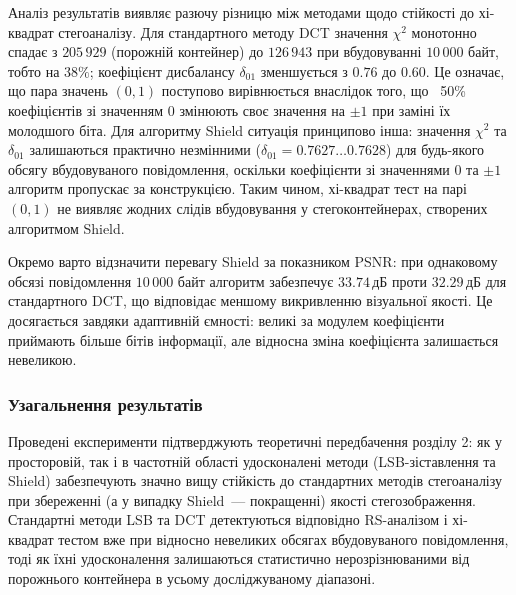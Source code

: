 Аналіз результатів виявляє разючу різницю між методами щодо стійкості до
хі-квадрат стегоаналізу. Для стандартного методу DCT значення $\chi^2$
монотонно спадає з $205\,929$ (порожній контейнер) до $126\,943$ при
вбудовуванні $10\,000$ байт, тобто на $38\%$; коефіцієнт дисбалансу
$\delta_{01}$ зменшується з $0.76$ до $0.60$. Це означає, що пара значень
$(0, 1)$ поступово вирівнюється внаслідок того, що ~50\% коефіцієнтів зі
значенням $0$ змінюють своє значення на $\pm 1$ при заміні їх молодшого
біта. Для алгоритму Shield ситуація принципово інша: значення $\chi^2$ та
$\delta_{01}$ залишаються практично незмінними ($\delta_{01} = 0.7627
\dots 0.7628$) для будь-якого обсягу вбудовуваного повідомлення, оскільки
коефіцієнти зі значеннями $0$ та $\pm 1$ алгоритм пропускає за конструкцією.
Таким чином, хі-квадрат тест на парі $(0, 1)$ не виявляє жодних слідів
вбудовування у стегоконтейнерах, створених алгоритмом Shield.

Окремо варто відзначити перевагу Shield за показником PSNR: при однаковому
обсязі повідомлення $10\,000$ байт алгоритм забезпечує $33.74$\,дБ проти
$32.29$\,дБ для стандартного DCT, що відповідає меншому викривленню
візуальної якості. Це досягається завдяки адаптивній ємності: великі за
модулем коефіцієнти приймають більше бітів інформації, але відносна зміна
коефіцієнта залишається невеликою.

\subsubsection*{Узагальнення результатів}

Проведені експерименти підтверджують теоретичні передбачення розділу 2: як
у просторовій, так і в частотній області удосконалені методи (LSB-зіставлення
та Shield) забезпечують значно вищу стійкість до стандартних методів
стегоаналізу при збереженні (а у випадку Shield~--- покращенні) якості
стегозображення. Стандартні методи LSB та DCT детектуються відповідно
RS-аналізом і хі-квадрат тестом вже при відносно невеликих обсягах
вбудовуваного повідомлення, тоді як їхні удосконалення залишаються
статистично нерозрізнюваними від порожнього контейнера в усьому
досліджуваному діапазоні.
